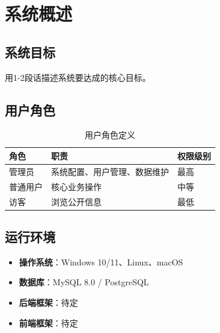 \documentclass[12pt,a4paper]{ctexart}
\begin{document}
\section{系统概述}
\subsection{系统目标}
用1-2段话描述系统要达成的核心目标。

\subsection{用户角色}
\begin{table}[H]
\centering
\caption{用户角色定义}
\begin{tabular}{lll}
\toprule
\textbf{角色} & \textbf{职责} & \textbf{权限级别} \\
\midrule
管理员   & 系统配置、用户管理、数据维护     & 最高 \\
普通用户 & 核心业务操作                   & 中等 \\
访客     & 浏览公开信息                   & 最低 \\
\bottomrule
\end{tabular}
\end{table}

\subsection{运行环境}
\begin{itemize}
    \item \textbf{操作系统}：Windows 10/11、Linux、macOS
    \item \textbf{数据库}：MySQL 8.0 / PostgreSQL
    \item \textbf{后端框架}：待定
    \item \textbf{前端框架}：待定
\end{itemize}

\end{document}
